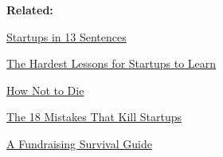 \textbf{Related:}


              
            
          
          

          
            
              
            
            
              
                \href{http://www.paulgraham.com/13sentences.html}{Startups in 13 Sentences}

              
            
            
              
            
            
              
            
            
              
                \href{http://www.paulgraham.com/startuplessons.html}{The Hardest Lessons for Startups to Learn}

              
            
            
              
            
            
              
            
            
              
                \href{http://www.paulgraham.com/die.html}{How Not to Die}

              
            
            
              
            
            
              
            
            
              
                \href{http://www.paulgraham.com/startupmistakes.html}{The 18 Mistakes That Kill Startups}

              
            
            
              
            
            
              
            
            
              
                \href{http://www.paulgraham.com/fundraising.html}{A Fundraising Survival Guide}

              
            
            
              
